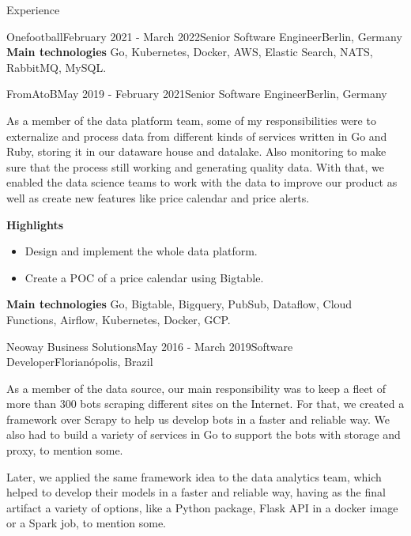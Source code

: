 \documentclass[
	a4paper, %
	10pt, %
]{resume} %
\begin{document}
\begin{rSection}{Experience}
\begin{rSubsection}{Onefootball}{February 2021 - March 2022}{Senior Software Engineer}{Berlin, Germany}
		\textbf{Main technologies}
			Go, Kubernetes, Docker, AWS, Elastic Search, NATS, RabbitMQ, MySQL.

	\end{rSubsection}

	\vspace{1mm}

	\begin{rSubsection}{FromAtoB}{May 2019 - February 2021}{Senior Software Engineer}{Berlin, Germany}
		\item[]
		As a member of the data platform team, some of my responsibilities were to externalize and process data from different kinds of services written in Go and Ruby,
		storing it in our dataware house and datalake.
		Also monitoring to make sure that the process still working and generating quality data.
		With that, we enabled the data science teams to work with the data to improve our product as well as create new features like price calendar and price alerts.

		\textbf{Highlights}
		\begin{itemize}
			\item Design and implement the whole data platform.
			\item Create a POC of a price calendar using Bigtable.
		\end{itemize}

		\textbf{Main technologies}
			Go, Bigtable, Bigquery, PubSub, Dataflow, Cloud Functions, Airflow, Kubernetes, Docker, GCP.


	\end{rSubsection}

	\vspace{1mm}

	\begin{rSubsection}{Neoway Business Solutions}{May 2016 - March 2019}{Software Developer}{Florianópolis, Brazil}
		\item[]
		As a member of the data source, our main responsibility was to keep a fleet of more than 300 bots scraping different sites on the Internet.
		For that, we created a framework over Scrapy to help us develop bots in a faster and reliable way.
		We also had to build a variety of services in Go to support the bots with storage and proxy, to mention some.

		Later, we applied the same framework idea to the data analytics team, which helped to develop their models in a faster and reliable way,
		having as the final artifact a variety of options, like a Python package, Flask API in a docker image or a Spark job, to mention some.


\end{rSubsection}
\end{rSection}
\end{document}
